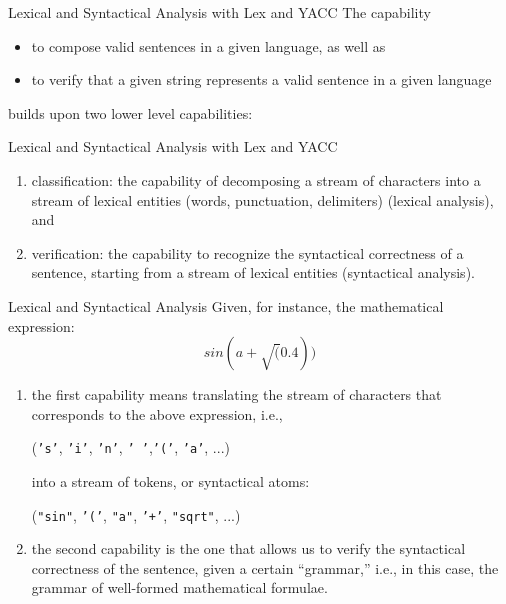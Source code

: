 
\begin{frame}{Lexical and Syntactical Analysis with Lex and YACC}
The capability 
\begin{itemize}
\item to compose valid sentences in a given language, as well as
\item to verify that a given string represents a valid sentence
in a given language
\end{itemize}
builds upon two lower level capabilities:
\end{frame}

\begin{frame}[fragile]{Lexical and Syntactical Analysis with Lex and YACC}
\begin{enumerate}
\item classification: the capability of decomposing a stream
of characters into a stream of lexical entities (words,
punctuation, delimiters) (lexical analysis), and
\item verification: the capability to recognize the
syntactical correctness of a sentence, starting from a
stream of lexical entities (syntactical analysis).
\end{enumerate}


\end{frame}
\begin{frame}[fragile]{Lexical and Syntactical Analysis}
Given, for instance, the mathematical expression:
$$ sin (a+\sqrt(0.4)) $$


\vspace{20pt}

\begin{enumerate}
\item the first capability means translating the stream of characters
that corresponds to the above expression, i.e.,

\vspace{20pt}


({\tt 's'}, {\tt 'i'}, {\tt 'n'}, {\tt ' '},{\tt '('}, {\tt 'a'}, ...)


\vspace{20pt}

into a stream of tokens, or syntactical atoms:


\vspace{20pt}

({\tt "sin"}, {\tt '('}, {\tt "a"}, {\tt '+'}, {\tt "sqrt"}, ...)

\item the second capability is the one
that allows us to verify the syntactical correctness of the sentence,
given a certain ``grammar,'' i.e., in this case, the grammar of
well-formed mathematical formulae.
\end{enumerate}



\end{frame}
